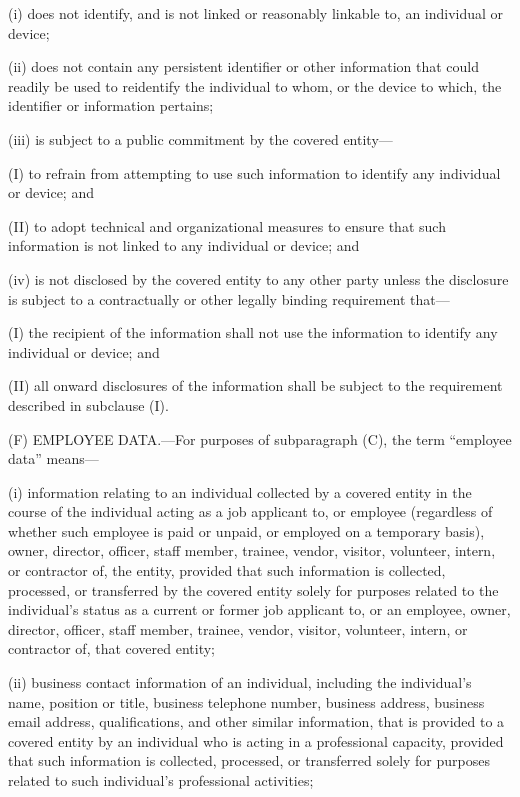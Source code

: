 (i) does not identify, and is not linked or reasonably linkable to, an individual or device;

(ii) does not contain any persistent identifier or other information that could readily be used to reidentify the individual to whom, or the device to which, the identifier or information pertains;

(iii) is subject to a public commitment by the covered entity—

(I) to refrain from attempting to use such information to identify any individual or device; and

(II) to adopt technical and organizational measures to ensure that such information is not linked to any individual or device; and

(iv) is not disclosed by the covered entity to any other party unless the disclosure is subject to a contractually or other legally binding requirement that—

(I) the recipient of the information shall not use the information to identify any individual or device; and

(II) all onward disclosures of the information shall be subject to the requirement described in subclause (I).

(F) EMPLOYEE DATA.—For purposes of subparagraph (C), the term “employee data” means—

(i) information relating to an individual collected by a covered entity in the course of the individual acting as a job applicant to, or employee (regardless of whether such employee is paid or unpaid, or employed on a temporary basis), owner, director, officer, staff member, trainee, vendor, visitor, volunteer, intern, or contractor of, the entity, provided that such information is collected, processed, or transferred by the covered entity solely for purposes related to the individual’s status as a current or former job applicant to, or an employee, owner, director, officer, staff member, trainee, vendor, visitor, volunteer, intern, or contractor of, that covered entity;

(ii) business contact information of an individual, including the individual's name, position or title, business telephone number, business address, business email address, qualifications, and other similar information, that is provided to a covered entity by an individual who is acting in a professional capacity, provided that such information is collected, processed, or transferred solely for purposes related to such individual's professional activities;

